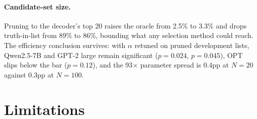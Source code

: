\documentclass[11pt]{article}
\begin{document}
\paragraph{Candidate-set size.} Pruning to the decoder's top 20 raises the oracle from
2.5\% to 3.3\% and drops truth-in-list from 89\% to 86\%, bounding what any selection
method could reach. The efficiency conclusion survives: with $\alpha$ retuned on pruned
development lists, Qwen2.5-7B and GPT-2 large remain significant ($p=0.024$, $p=0.045$),
OPT slips below the bar ($p=0.12$), and the 93$\times$ parameter spread is 0.4pp at
$N=20$ against 0.3pp at $N=100$.

\section{Limitations}
\end{document}
